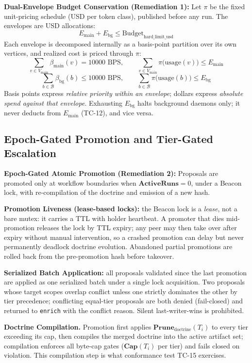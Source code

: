 \documentclass[11pt]{article}
\begin{document}
\textbf{Dual-Envelope Budget Conservation (Remediation 1):}
Let $\pi$ be the fixed unit-pricing schedule (USD per token class),
published before any run. The envelopes are USD allocations:
\[
E_{\text{main}} + E_{\text{bg}} \le \text{Budget}_{\text{hard\_limit\_usd}}
\]
Each envelope is decomposed internally as a basis-point partition over its
own vertices, and realized cost is priced through $\pi$:
\[
\sum_{v \in V_{\text{main}}} \beta_{\text{main}}(v) = 10000 \text{ BPS},
\qquad
\sum_{v \in V_{\text{main}}} \pi\big(\text{usage}(v)\big) \le E_{\text{main}}
\]
\[
\sum_{b \in \mathcal{B}} \beta_{\text{bg}}(b) \le 10000 \text{ BPS},
\qquad
\sum_{b \in \mathcal{B}} \pi\big(\text{usage}(b)\big) \le E_{\text{bg}}
\]
Basis points express \emph{relative priority within an envelope}; dollars
express \emph{absolute spend against that envelope}. Exhausting
$E_{\text{bg}}$ halts background daemons only; it never deducts from
$E_{\text{main}}$ (TC-12), and vice versa.

\subsection{Epoch-Gated Promotion and Tier-Gated Escalation}
\label{sec:epoch-gated-promotion}
\textbf{Epoch-Gated Atomic Promotion (Remediation 2):} Proposals are promoted only at workflow boundaries when $\mathbf{ActiveRuns} = 0$, under a Beacon lock, with re-compilation of the doctrine and emission of a new hash.

\textbf{Promotion Liveness (lease-based locks):} the Beacon lock is a
\emph{lease}, not a bare mutex: it carries a TTL with holder heartbeat. A
promoter that dies mid-promotion releases the lock by TTL expiry; any peer
may then take over after expiry without manual intervention, so a crashed
promotion can delay but never permanently deadlock doctrine evolution.
Abandoned partial promotions are rolled back from the pre-promotion hash
before takeover.

\textbf{Serialized Batch Application:} all proposals validated since the
last promotion are applied as one serialized batch under a single lock
acquisition. Two proposals whose target scopes overlap conflict unless one
strictly dominates the other by tier precedence; conflicting equal-tier
proposals are both denied (fail-closed) and returned to \texttt{enrich}
with the conflict reason. Silent last-writer-wins is prohibited.

\textbf{Doctrine Compilation.}\label{sec:doctrine-compilation}
Promotion first applies $\mathbf{Prune}_{\text{doctrine}}(T_i)$ to every tier
exceeding its cap, then compiles the merged doctrine into the active artifact
set; compilation enforces all byte-cap gates ($\mathbf{Cap}(T_i)$ per tier)
and fails closed on violation. This compilation step is what conformance test
TC-15 exercises.
\end{document}
